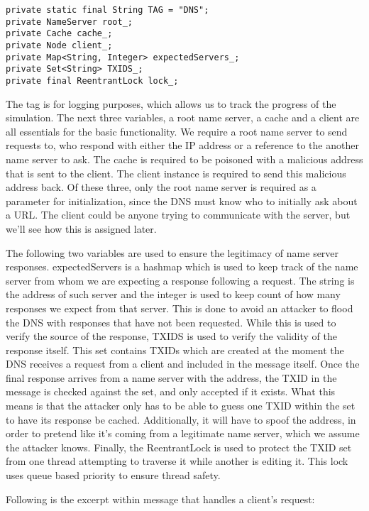 \documentclass[a4paper, 12pt]{article} %
\begin{document}
\begin{lstlisting}
private static final String TAG = "DNS";	
private NameServer root_;
private Cache cache_;
private Node client_;
private Map<String, Integer> expectedServers_;
private Set<String> TXIDS_;
private final ReentrantLock lock_;
\end{lstlisting}

The tag is for logging purposes, which allows us to track the progress of the simulation. The next three variables, a root name server, a cache and a client are all essentials for the basic functionality. We require a root name server to send requests to, who respond with either the IP address or a reference to the another name server to ask. The cache is required to be poisoned with a malicious address that is sent to the client. The client instance is required to send this malicious address back. Of these three, only the root name server is required as a parameter for initialization, since the DNS must know who to initially ask about a URL. The client could be anyone trying to communicate with the server, but we’ll see how this is assigned later. 

The following two variables are used to ensure the legitimacy of name server responses. expectedServers is a hashmap which is used to keep track of the name server from whom we are expecting a response following a request. The string is the address of such server and the integer is used to keep count of how many responses we expect from that server. This is done to avoid an attacker to flood the DNS with responses that have not been requested. While this is used to verify the source of the response, TXIDS is used to verify the validity of the response itself. This set contains TXIDs which are created at the moment the DNS receives a request from a client and included in the message itself. Once the final response arrives from a name server with the address, the TXID in the message is checked against the set, and only accepted if it exists. What this means is that the attacker only has to be able to guess one TXID within the set to have its response be cached. Additionally, it will have to spoof the address, in order to pretend like it's coming from a legitimate name server, which we assume the attacker knows. Finally, the ReentrantLock is used to protect the TXID set from one thread attempting to traverse it while another is editing it. This lock uses queue based priority to ensure thread safety. 

Following is the excerpt within message that handles a client's request: 
\end{document}
